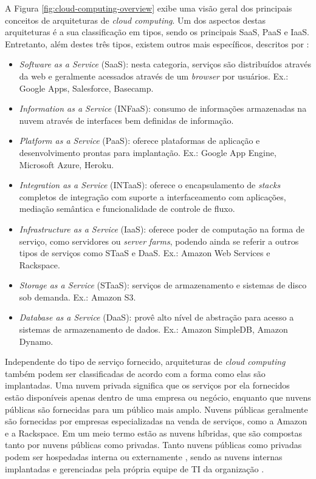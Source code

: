 \documentclass[diss]{template/setrem}
\begin{document}
A Figura \ref{fig:cloud-computing-overview} exibe uma visão geral dos principais conceitos de arquiteturas de \emph{cloud computing}. Um dos aspectos destas arquiteturas é a sua classificação em tipos, sendo os principais SaaS, PaaS e IaaS. Entretanto, além destes três tipos, existem outros mais específicos, descritos por \citet{Vogel2011}:
\begin{itemize}
	\item \emph{Software as a Service} (SaaS): nesta categoria, serviços são distribuídos através da web e geralmente acessados através de um \emph{browser} por usuários. Ex.: Google Apps, Salesforce, Basecamp.
	\item \emph{Information as a Service} (INFaaS): consumo de informações armazenadas na nuvem através de interfaces bem definidas de informação.
	\item \emph{Platform as a Service} (PaaS): oferece plataformas de aplicação e desenvolvimento prontas para implantação. Ex.: Google App Engine, Microsoft Azure, Heroku.
	\item \emph{Integration as a Service} (INTaaS): oferece o encapsulamento de \emph{stacks} completos de integração com suporte a interfaceamento com aplicações, mediação semântica e funcionalidade de controle de fluxo.
	\item \emph{Infrastructure as a Service} (IaaS): oferece poder de computação na forma de serviço, como servidores ou \emph{server farms}, podendo ainda se referir a outros tipos de serviços como STaaS e DaaS. Ex.: Amazon Web Services e Rackspace.
	\item \emph{Storage as a Service} (STaaS): serviços de armazenamento e sistemas de disco sob demanda. Ex.: Amazon S3.
	\item \emph{Database as a Service} (DaaS): provê alto nível de abstração para acesso a sistemas de armazenamento de dados. Ex.: Amazon SimpleDB, Amazon Dynamo.
\end{itemize}

Independente do tipo de serviço fornecido, arquiteturas de \emph{cloud computing} também podem ser classificadas de acordo com a forma como elas são implantadas. Uma nuvem privada significa que os serviços por ela fornecidos estão disponíveis apenas dentro de uma empresa ou negócio, enquanto que nuvens públicas são fornecidas para um público mais amplo. Nuvens públicas geralmente são fornecidas por empresas especializadas na venda de serviços, como a Amazon e a Rackspace. Em um meio termo estão as nuvens híbridas, que são compostas tanto por nuvens públicas como privadas. Tanto nuvens públicas como privadas podem ser hospedadas interna ou externamente , sendo as nuvens internas implantadas e gerenciadas pela própria equipe de TI da organização \citep{Vogel2011}.
\end{document}
